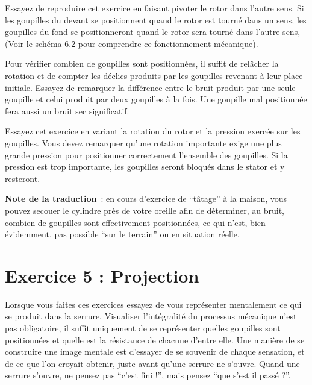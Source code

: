 \documentclass[a4paper,french,11pt,twoside]{report}
\begin{document}
Essayez de reproduire cet exercice en faisant pivoter le rotor dans l'autre sens. Si les goupilles du devant se positionnent quand le rotor est tourné dans un sens, les goupilles du fond se positionneront quand le rotor sera tourné dans l'autre sens, (Voir le schéma 6.2 pour comprendre ce fonctionnement mécanique).

Pour vérifier combien de goupilles sont positionnées, il suffit de relâcher la rotation et de compter les déclics produits par les goupilles revenant à leur place initiale. Essayez de remarquer la différence entre le bruit produit par une seule goupille et celui produit par deux goupilles à la fois. Une goupille mal positionnée fera aussi un bruit sec significatif.

Essayez cet exercice en variant la rotation du rotor et la pression exercée sur les goupilles. Vous devez remarquer qu'une rotation importante exige une plus grande pression pour positionner correctement l'ensemble des goupilles. Si la pression est trop importante, les goupilles seront bloqués dans le stator et y resteront.

\noindent \textbf{Note de la traduction}~: en cours d'exercice de \enquote{tâtage} à la maison, vous pouvez secouer le cylindre près de votre oreille afin de déterminer, au bruit, combien de goupilles sont effectivement positionnées, ce qui n'est, bien évidemment, pas possible \enquote{sur le terrain} ou en situation réelle.

\section{Exercice 5 : Projection}

Lorsque vous faites ces exercices essayez de vous représenter mentalement ce qui se produit dans la serrure. Visualiser l'intégralité du processus mécanique n'est pas obligatoire, il suffit uniquement de se représenter quelles goupilles sont positionnées et quelle est la résistance de chacune d'entre elle. Une manière de se construire une image mentale est d'essayer de se souvenir de chaque sensation, et de ce que l'on croyait obtenir, juste avant qu'une serrure ne s'ouvre. Quand une serrure s'ouvre, ne pensez pas \enquote{c'est fini !}, mais pensez \enquote{que s'est il passé ?}.
\end{document}
